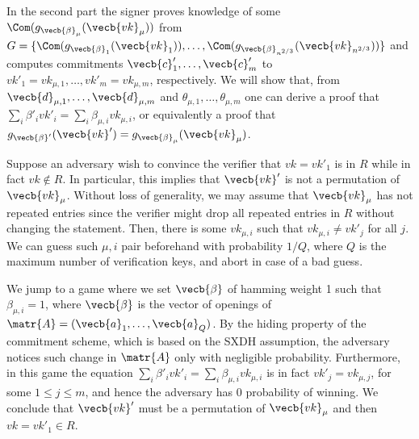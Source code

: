 In the second part the signer proves knowledge of some $\Com(g_{\vecb{\beta}_\mu}(\vecb{vk}_\mu))$ from $G = \{\Com(g_{\vecb{\beta}_1}(\vecb{vk}_1)),\allowbreak\ldots,\Com(g_{\vecb{\beta}_{n^{2/3}}}(\vecb{vk}_{n^{2/3}}))\}$ and  computes commitments $\vecb{c}'_1,\allowbreak\ldots,\vecb{c}'_m$ to $vk'_1=vk_{\mu,1},\ldots,vk'_m=vk_{\mu,m}$, respectively. We will show that, from $\vecb{d}_{\mu,1},\ldots,\vecb{d}_{\mu,m}$ and $\theta_{\mu,1},\ldots,\theta_{\mu,m}$ one can derive a proof that $\sum_i \beta'_i vk'_i  = \sum_{i} \beta_{\mu,i}vk_{\mu,i}$, or equivalently a proof that $g_{\vecb{\beta}'}(\vecb{vk}') = g_{\vecb{\beta}_\mu}(\vecb{vk}_\mu)$.


Suppose an adversary wish to convince the verifier that $vk=vk'_1$ is in $R$ while in fact $vk\notin R$. In particular, this implies that $\vecb{vk}'$ is not a permutation of $\vecb{vk}_\mu$. Without loss of generality, we may assume that $\vecb{vk}_\mu$ has not repeated entries since the verifier might drop all repeated entries in $R$ without changing the statement. Then, there is some $vk_{\mu,i}$ such that $vk_{\mu,i}\neq vk'_j$ for all $j$.
We can guess such $\mu,i$ pair beforehand with probability $1/Q$, where $Q$ is the maximum number of verification keys, and abort in case of a bad guess.

We jump to a game where we set $\vecb{\beta}$ of
 hamming weight 1 such that $\beta_{\mu,i}=1$, where $\vecb{\beta}$ is the vector of openings of $\matr{A} = (\vecb{a}_1,\ldots,\vecb{a}_Q)$.
By the hiding property of the commitment scheme, which is based on the SXDH assumption, the adversary notices such change in $\matr{A}$ only with negligible probability. Furthermore, in this game the equation $\sum_{i}\beta'_i vk'_i = \sum_{i}\beta_{\mu,i} vk_{\mu,i}$ is in fact $vk'_j = vk_{\mu,j}$, for some $1\leq j \leq m$, and hence the adversary has 0 probability of winning. We conclude that $\vecb{vk}'$ must be a permutation of $\vecb{vk}_{\mu}$ and then $vk = vk'_1\in R$.


